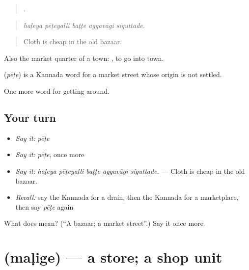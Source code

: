 \begin{quote}
    .
\end{quote}

\begin{quote}
\emph{haḷeya pēṭeyalli baṭṭe aggavāgi siguttade.}
\end{quote}

\begin{quote}
Cloth is cheap in the old bazaar.
\end{quote}

Also the market quarter of a town:  , to go into town.

\begin{cousinweb}
\textbf{} (\emph{pēṭe}) is a Kannada word for a market street whose origin is not settled.
\end{cousinweb}

\begin{grammarlens}[title={What you've built}]
One more word for getting around.
\end{grammarlens}

\subsection*{Your turn}
\begin{itemize}
\raggedright
  \item \emph{Say it:} \emph{pēṭe}
  \item \emph{Say it:} \emph{pēṭe}, once more
  \item \emph{Say it:} \emph{haḷeya pēṭeyalli baṭṭe aggavāgi siguttade.} — Cloth is cheap in the old bazaar.
  \item \emph{Recall:} say the Kannada for a drain, then the Kannada for a marketplace, then say \emph{pēṭe} again
\end{itemize}

\begin{tcolorbox}[breakable,colback=teal!4,colframe=teal!35!black,title={Before you move on}]
What does  mean? (\textquotedblleft{}A bazaar; a market street\textquotedblright{}.) Say it once more.
\end{tcolorbox}
\section[\texorpdfstring{\kn{ಮಳಿಗೆ} (maḷige)}{ಮಳಿಗೆ (maḷige)}]{ (maḷige) — a store; a shop unit}

